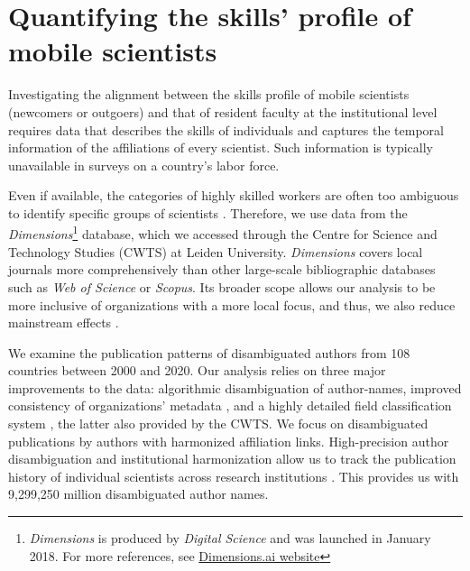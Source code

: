 \documentclass[draft,final]{vutinfth} %
\begin{document}
\section{Quantifying the skills' profile of mobile scientists}
\label{Materials and Methods}
Investigating the alignment between the skills profile of mobile scientists (newcomers or outgoers) and that of resident faculty at the institutional level requires data that describes the skills of individuals and captures the temporal information of the affiliations of every scientist. Such information is typically unavailable in surveys on a country's labor force. 

Even if available, the categories of highly skilled workers are often too ambiguous to identify specific groups of scientists \cite{stephan2001exceptional}. Therefore, we use data from the {\em Dimensions}\footnote{{\em Dimensions} is produced by {\em Digital Science} and was launched in January 2018. For more references, see \href{https://www.dimensions.ai/}{Dimensions.ai website}} database, which we accessed through the Centre for Science and Technology Studies (CWTS) at Leiden University. {\em Dimensions} covers local journals more comprehensively than other large-scale bibliographic databases such as {\em Web of Science} or {\em Scopus}. Its broader scope allows our analysis to be more inclusive of organizations with a more local focus, and thus, we also reduce mainstream effects \cite{machavcek2022researchers, hook2018dimensions}. 

We examine the publication patterns of disambiguated authors from 108 countries between 2000 and 2020. Our analysis relies on three major improvements to the data: algorithmic disambiguation of author-names, improved consistency of organizations' metadata \cite{hook2018dimensions}, and a highly detailed field classification system \cite{traag2019louvain}, the latter also provided by the CWTS. We focus on disambiguated publications by authors with harmonized affiliation links. High-precision author disambiguation and institutional harmonization allow us to track the publication history of individual scientists across research institutions \cite{machavcek2022researchers}. This provides us with 9,299,250 million disambiguated author names.
\end{document}
